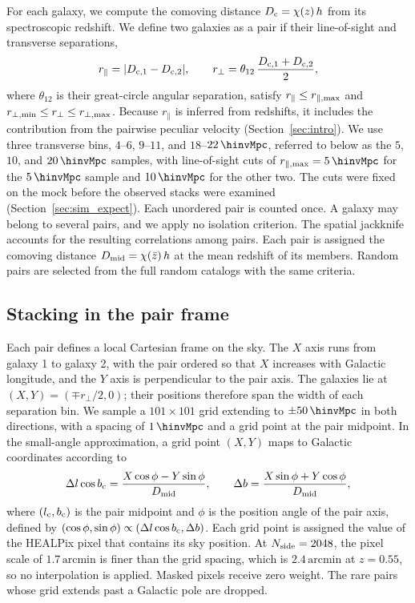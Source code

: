 For each galaxy, we compute the comoving distance $D_{\rm c}=\chi(z)\,h$ from
its spectroscopic redshift. We define two galaxies as a pair if their
line-of-sight and transverse separations,
\begin{equation}
  r_{\parallel} = |D_{{\rm c},1}-D_{{\rm c},2}|, \qquad
  r_{\perp} = \theta_{12}\,\frac{D_{{\rm c},1}+D_{{\rm c},2}}{2},
  \label{eq:separations}
\end{equation}
where $\theta_{12}$ is their great-circle angular separation, satisfy
$r_{\parallel}\leq r_{\parallel,{\rm max}}$ and
$r_{\perp,{\rm min}}\leq r_{\perp}\leq r_{\perp,{\rm max}}$. Because
$r_{\parallel}$ is inferred from redshifts, it includes the contribution from
the pairwise peculiar velocity (Section~\ref{sec:intro}). We
use three transverse bins, $4$--$6$, $9$--$11$, and $18$--$22\,\hinvMpc$,
referred to below as the $5$, $10$, and $20\,\hinvMpc$ samples, with
line-of-sight cuts of $r_{\parallel,{\rm max}}=5\,\hinvMpc$ for the
$5\,\hinvMpc$ sample and $10\,\hinvMpc$ for the other two. The cuts were
fixed on the mock before the observed stacks were examined
(Section~\ref{sec:sim_expect}). Each unordered pair is counted once. A
galaxy may belong to several pairs, and we apply no isolation criterion. The
spatial jackknife accounts for the resulting correlations among pairs. Each
pair is assigned the comoving distance
$D_{\rm mid}=\chi(\bar z)\,h$ at the mean redshift of its members. Random
pairs are selected from the full random catalogs with the same criteria.

\subsection{Stacking in the pair frame}
\label{sec:stacking}

Each pair defines a local Cartesian frame on the sky. The $X$ axis runs from
galaxy 1 to galaxy 2, with the pair ordered so that $X$ increases with
Galactic longitude, and the $Y$ axis is perpendicular to the pair axis. The
galaxies lie at $(X,Y)=(\mp r_{\perp}/2,0)$; their positions therefore span
the width of each separation bin. We sample a $101\times101$ grid extending
to $\pm50\,\hinvMpc$ in both directions, with a spacing of
$1\,\hinvMpc$ and a grid point at the pair midpoint. In the small-angle
approximation, a grid point $(X,Y)$ maps to Galactic coordinates according to
\begin{equation}
  \Delta l\cos b_{\rm c} = \frac{X\cos\phi - Y\sin\phi}{D_{\rm mid}}, \qquad
  \Delta b = \frac{X\sin\phi + Y\cos\phi}{D_{\rm mid}},
  \label{eq:grid_to_sky}
\end{equation}
where $(l_{\rm c},b_{\rm c})$ is the pair midpoint and $\phi$ is the
position angle of the pair axis, defined by
$(\cos\phi,\sin\phi)\propto(\Delta l\cos b_{\rm c},\Delta b)$.
Each grid point is assigned the value of the HEALPix pixel that contains its
sky position. At $N_{\rm side}=2048$, the pixel scale of
$1.7\,\mathrm{arcmin}$ is
finer than the grid spacing, which is $2.4\,\mathrm{arcmin}$ at $z=0.55$,
so no interpolation is applied. Masked pixels receive zero weight. The rare
pairs whose grid extends past a Galactic pole are dropped.

